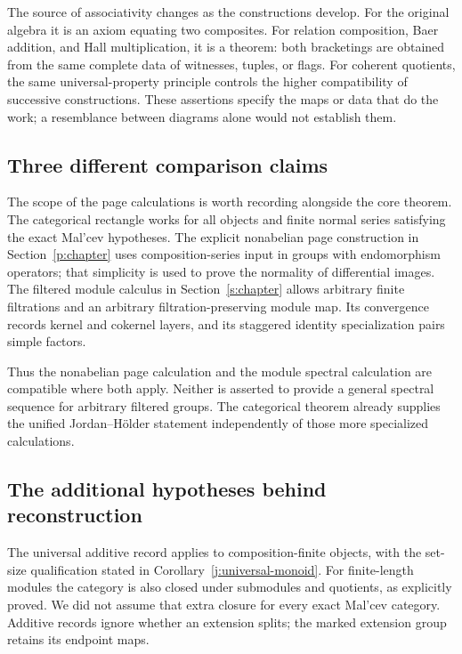 \documentclass[11pt]{article}
\theoremstyle{definition}
\theoremstyle{remark}\newtheorem{remark}[theorem]{Remark}
\begin{document}
The source of associativity changes as the constructions develop. For the
original algebra it is an axiom equating two composites. For relation
composition, Baer addition, and Hall multiplication, it is a theorem:
both bracketings are obtained from the same complete data of witnesses,
tuples, or flags. For coherent quotients, the same universal-property
principle controls the higher compatibility of successive constructions.
These assertions specify the maps or data that do the work; a resemblance
between diagrams alone would not establish them.

\subsection{Three different comparison claims}

The scope of the page calculations is worth recording alongside the core
theorem. The categorical rectangle works for all objects and finite normal
series satisfying the exact Mal'cev hypotheses. The explicit nonabelian
page construction in Section~\ref{p:chapter} uses composition-series
input in groups with endomorphism operators; that simplicity is used to
prove the normality of differential images. The filtered module calculus
in Section~\ref{s:chapter} allows arbitrary finite filtrations and an
arbitrary filtration-preserving module map. Its convergence records
kernel and cokernel layers, and its staggered identity specialization
pairs simple factors.

Thus the nonabelian page calculation and the module spectral calculation
are compatible where both apply. Neither is asserted to provide a general
spectral sequence for arbitrary filtered groups. The categorical theorem
already supplies the unified Jordan--H\"older statement independently of
those more specialized calculations.

\subsection{The additional hypotheses behind reconstruction}

The universal additive record applies to composition-finite objects, with
the set-size qualification stated in Corollary~\ref{j:universal-monoid}.
For finite-length modules the category is also closed under submodules
and quotients, as explicitly proved. We did not assume that extra closure
for every exact Mal'cev category. Additive records ignore whether an
extension splits; the marked extension group retains its endpoint maps.
\end{document}

